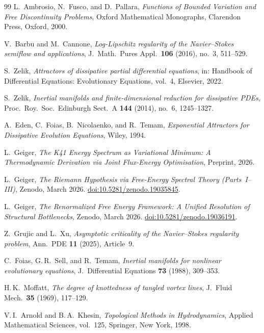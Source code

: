 \documentclass[12pt,a4paper]{article}
\theoremstyle{definition}
\theoremstyle{plain}
\theoremstyle{remark}
\begin{document}
\begin{thebibliography}{99}
L.~Ambrosio, N.~Fusco, and D.~Pallara,
\emph{Functions of Bounded Variation and Free Discontinuity Problems},
Oxford Mathematical Monographs, Clarendon Press, Oxford, 2000.

V.~Barbu and M.~Cannone,
\emph{Log-Lipschitz regularity of the Navier--Stokes semiflow and applications},
J.~Math.\ Pures Appl.\ \textbf{106} (2016), no.~3, 511--529.

S.~Zelik,
\emph{Attractors of dissipative partial differential equations},
in: Handbook of Differential Equations: Evolutionary Equations, vol.~4, Elsevier, 2022.

S.~Zelik,
\emph{Inertial manifolds and finite-dimensional reduction for
dissipative PDEs},
Proc.\ Roy.\ Soc.\ Edinburgh Sect.~A \textbf{144} (2014), no.~6,
1245--1327.

A.~Eden, C.~Foias, B.~Nicolaenko, and R.~Temam,
\emph{Exponential Attractors for Dissipative Evolution Equations},
Wiley, 1994.

L.~Geiger, \emph{The K41 Energy Spectrum as Variational Minimum:
A Thermodynamic Derivation via Joint Flux-Energy Optimisation},
Preprint, 2026.

L.~Geiger, \emph{The Riemann Hypothesis via Free-Energy Spectral Theory (Parts~I--III)},
Zenodo, March 2026.
\href{https://doi.org/10.5281/zenodo.19035845}{doi:10.5281/zenodo.19035845}.

L.~Geiger, \emph{The Renormalized Free Energy Framework: A Unified Resolution of Structural Bottlenecks},
Zenodo, March 2026.
\href{https://doi.org/10.5281/zenodo.19036191}{doi:10.5281/zenodo.19036191}.

Z.~Grujic and L.~Xu,
\emph{Asymptotic criticality of the Navier--Stokes regularity problem},
Ann.\ PDE \textbf{11} (2025), Article~9.

C.~Foias, G.\,R.~Sell, and R.~Temam,
\emph{Inertial manifolds for nonlinear evolutionary equations},
J.~Differential Equations \textbf{73} (1988), 309--353.

H.\,K.~Moffatt,
\emph{The degree of knottedness of tangled vortex lines},
J.~Fluid Mech.\ \textbf{35} (1969), 117--129.

V.\,I.~Arnold and B.\,A.~Khesin,
\emph{Topological Methods in Hydrodynamics},
Applied Mathematical Sciences, vol.~125,
Springer, New York, 1998.


\end{thebibliography}
\end{document}
